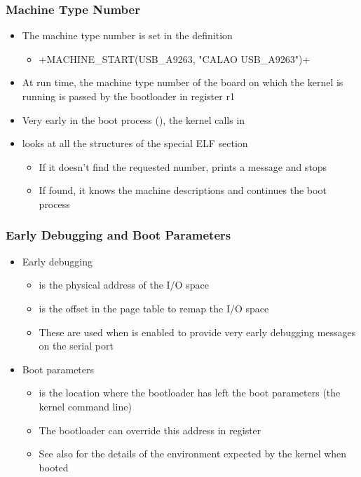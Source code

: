 \begin{frame}[fragile]
  \frametitle{Machine Type Number}
  \begin{itemize}
  \item The machine type number is set in the 
    definition
    \begin{itemize}
    \item {}+MACHINE_START(USB_A9263, "CALAO USB_A9263")+
    \end{itemize}
  \item At run time, the machine type number of the board on which the
    kernel is running is passed by the bootloader in register r1
  \item Very early in the boot process
    (), the kernel calls
     in
  \item {} looks at all the
     structures of the special ELF section
    \begin{itemize}
    \item If it doesn't find the requested number, prints a message
      and stops
    \item If found, it knows the machine descriptions and continues
      the boot process
    \end{itemize}
  \end{itemize}
\end{frame}

\begin{frame}
  \frametitle{Early Debugging and Boot Parameters}
  \begin{itemize}
  \item Early debugging
    \begin{itemize}
    \item {} is the physical address of the I/O space
    \item {} is the offset in the page table to remap
      the I/O space
    \item These are used when  is enabled to
      provide very early debugging messages on the serial port
    \end{itemize}
  \item Boot parameters
    \begin{itemize}
    \item {} is the location where the bootloader has
      left the boot parameters (the kernel command line)
    \item The bootloader can override this address in register
    \item See also  for the details of
      the environment expected by the kernel when booted
    \end{itemize}
  \end{itemize}
\end{frame}


